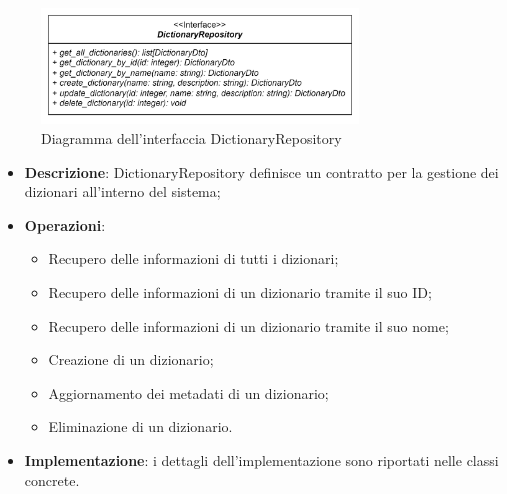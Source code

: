 \label{DictionaryRepository}
\begin{figure}[H]
    \centering
    \includegraphics[width=0.75\textwidth]{assets/Backend/dictionary_repository.png}
    \caption{Diagramma dell'interfaccia DictionaryRepository}
  \end{figure}
\begin{itemize}
  \item \textbf{Descrizione}: DictionaryRepository definisce un contratto per la gestione dei dizionari all'interno del sistema; 
  \item \textbf{Operazioni}: 
    \begin{itemize}
      \item Recupero delle informazioni di tutti i dizionari;
      \item Recupero delle informazioni di un dizionario tramite il suo ID;
      \item Recupero delle informazioni di un dizionario tramite il suo nome;
      \item Creazione di un dizionario;
      \item Aggiornamento dei metadati di un dizionario;
      \item Eliminazione di un dizionario.
    \end{itemize}
  \item \textbf{Implementazione}: i dettagli dell'implementazione sono riportati nelle classi concrete.
\end{itemize} 

